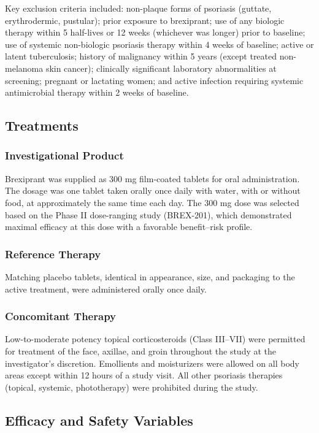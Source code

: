 \documentclass[11pt, a4paper]{article}
\begin{document}
Key exclusion criteria included: non-plaque forms of psoriasis (guttate, erythrodermic, pustular); prior exposure to brexiprant; use of any biologic therapy within 5 half-lives or 12 weeks (whichever was longer) prior to baseline; use of systemic non-biologic psoriasis therapy within 4 weeks of baseline; active or latent tuberculosis; history of malignancy within 5 years (except treated non-melanoma skin cancer); clinically significant laboratory abnormalities at screening; pregnant or lactating women; and active infection requiring systemic antimicrobial therapy within 2 weeks of baseline.

\subsection{Treatments}

\subsubsection{Investigational Product}

Brexiprant was supplied as 300 mg film-coated tablets for oral administration. The dosage was one tablet taken orally once daily with water, with or without food, at approximately the same time each day. The 300 mg dose was selected based on the Phase II dose-ranging study (BREX-201), which demonstrated maximal efficacy at this dose with a favorable benefit--risk profile.

\subsubsection{Reference Therapy}

Matching placebo tablets, identical in appearance, size, and packaging to the active treatment, were administered orally once daily.

\subsubsection{Concomitant Therapy}

Low-to-moderate potency topical corticosteroids (Class III--VII) were permitted for treatment of the face, axillae, and groin throughout the study at the investigator's discretion. Emollients and moisturizers were allowed on all body areas except within 12 hours of a study visit. All other psoriasis therapies (topical, systemic, phototherapy) were prohibited during the study.

\subsection{Efficacy and Safety Variables}
\end{document}
